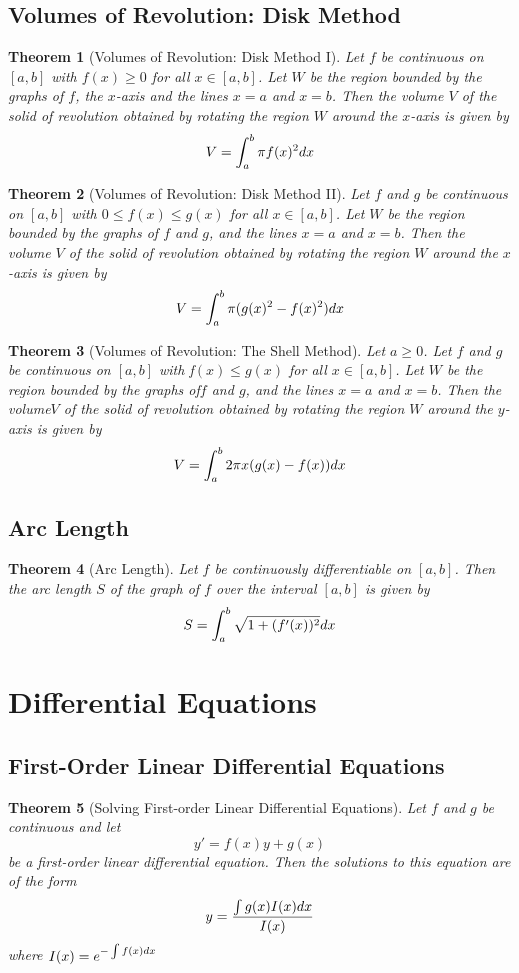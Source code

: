 \documentclass[10pt]{article}
\theoremstyle{break}
\newtheorem{thm}{Theorem}[subsection]
\begin{document}
\subsection{Volumes of Revolution: Disk Method}
\begin{thm}[Volumes of Revolution: Disk Method I]
    Let $f$ be continuous on $[a,b]$ with $f(x) \ge 0$  for all $x \in [a,b]$. Let $W$ be the region bounded by the graphs of $f$, the $x$-axis and the lines $x = a$ and $x = b$. Then the volume $V$ of the solid of revolution obtained by rotating the region $W$ around the $x$-axis is given by $$V = \int^b_a \pi f(x)^2 \space dx$$
\end{thm}
\begin{thm}[Volumes of Revolution: Disk Method II]
    Let $f$ and $g$ be continuous on $[a,b]$ with $0 \le f(x) \le g(x)$ for all $x \in [a,b]$. Let $W$ be the region bounded by the graphs of $f$ and $g$, and the lines $x = a$ and $x = b$. Then the volume $V$ of the solid of revolution obtained by rotating the region $W$ around the $x$-axis is given by $$V = \int^b_a \pi(g(x)^2 - f(x)^2)\space dx$$
\end{thm}
\begin{thm}[Volumes of Revolution: The Shell Method]
    Let $a \ge 0$. Let $f$ and $g$ be continuous on $ [a,b]$ with f$(x) \le g(x)$ for all $x \in [a, b]$. Let $W$ be the region bounded by the graphs of$ f$ and $g$, and the lines $x = a $ and $x = b$. Then the volume$ V$ of the solid of revolution obtained by rotating the region $W$ around the $y$-axis is given by $$V = \int^b_a 2\pi x(g(x) - f(x)) \space dx$$
\end{thm}
\subsection{Arc Length}
\begin{thm}[Arc Length]
    Let $ f $ be continuously differentiable on $[a, b]$. Then the arc length $S$ of the graph of $f$ over the interval $[a, b]$ is given by $$S = \int^b_a \sqrt{1 + (f'(x))^2} \space dx$$
\end{thm}


\newpage


\section{Differential Equations}
\subsection{First-Order Linear Differential Equations}
\begin{thm}[Solving First-order Linear Differential Equations]
    Let $f$ and $g$  be continuous and let $$y' = f(x)y + g(x)$$ be a first-order linear differential equation. Then the solutions to this equation are of the form $$y = \dfrac{\int g(x)I(x) \space dx}{I(x)}$$ where $I(x) = e^{- \int f(x) \space dx}$
\end{thm}
\end{document}
